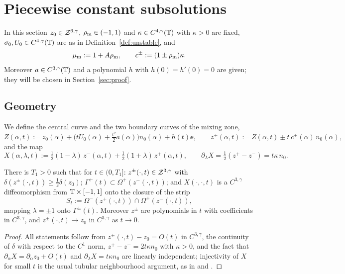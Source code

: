 \section{Piecewise constant subsolutions}\label{sec:ansatz}

In this section $z_0\in\mathcal{Z}^{6,\gamma}$, $\rho_{\mathrm m}\in(-1,1)$ and $\kappa\in C^{4,\gamma}(\mathbb{T})$ with $\kappa>0$ are fixed, $\sigma_0,U_0\in C^{4,\gamma}(\mathbb{T})$ are as in Definition~\ref{def:unstable}, and
\[
\mu_{\mathrm m}:=1+A\rho_{\mathrm m},\qquad c^\pm:=(1\pm\rho_{\mathrm m})\kappa .
\]
Moreover $a\in C^{3,\gamma}(\mathbb{T})$ and a polynomial $h$ with $h(0)=h'(0)=0$ are given; they will be chosen in Section~\ref{sec:proof}.

\subsection{Geometry}
We define the central curve and the two boundary curves of the mixing zone,
\begin{equation}\label{eq:curves}
Z(\alpha,t):=z_0(\alpha)+\Big(tU_0(\alpha)+\tfrac{t^2}2a(\alpha)\Big)n_0(\alpha)+h(t)\ee,\qquad z^\pm(\alpha,t):=Z(\alpha,t)\pm t\,c^\pm(\alpha)\,n_0(\alpha),
\end{equation}
and the map
\begin{equation}\label{eq:X}
X(\alpha,\lambda,t):=\tfrac12(1-\lambda)\,z^-(\alpha,t)+\tfrac12(1+\lambda)\,z^+(\alpha,t),\qquad \partial_\lambda X=\tfrac12(z^+-z^-)=t\kappa\,n_0 .
\end{equation}

\begin{lemma}\label{lem:geometry}
There is $T_1>0$ such that for $t\in(0,T_1]$: $z^\pm(\cdot,t)\in\mathcal{Z}^{3,\gamma}$ with $\delta(z^\pm(\cdot,t))\ge\frac12\delta(z_0)$; $\Gamma^+(t)\subset\Omega^+(z^-(\cdot,t))$; and
$X(\cdot,\cdot,t)$ is a $C^{3,\gamma}$ diffeomorphism from $\mathbb{T}\times[-1,1]$ onto the closure of the strip
\[
S_t:=\Omega^-(z^+(\cdot,t))\cap\Omega^+(z^-(\cdot,t)),
\]
mapping $\lambda=\pm1$ onto $\Gamma^\pm(t)$. Moreover $z^\pm$ are polynomials in $t$ with coefficients in $C^{3,\gamma}$, and $z^\pm(\cdot,t)\to z_0$ in $C^{3,\gamma}$ as $t\to0$.
\end{lemma}

\begin{proof}
All statements follow from $z^\pm(\cdot,t)-z_0=O(t)$ in $C^{3,\gamma}$, the continuity of $\delta$ with respect to the $C^1$ norm, $z^+-z^-=2t\kappa n_0$ with $\kappa>0$, and the fact that
$\partial_\alpha X=\partial_\alpha z_0+O(t)$ and $\partial_\lambda X=t\kappa n_0$ are linearly independent; injectivity of $X$ for small $t$ is the usual tubular neighbourhood argument, as in
\cite[Lemma~B.1]{CFM22} and \cite[Lemma~4.1]{LM26}.
\end{proof}


